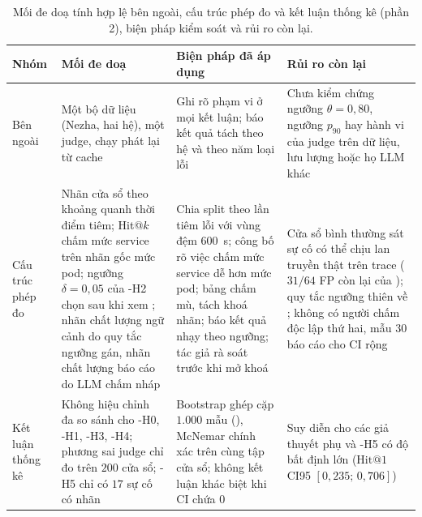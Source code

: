 \begin{table}[H]
  \centering
  \caption[Mối đe doạ tính hợp lệ bên ngoài, phép đo và thống kê]{Mối đe doạ tính hợp lệ bên ngoài, cấu trúc phép đo và kết luận thống kê (phần 2), biện pháp kiểm soát và rủi ro còn lại.}
  \label{tab:ch7-hop-le-khac}
  \tblfont
  \tblsetup
  \setlength{\tabcolsep}{3.5pt}
  \begin{tabularx}{\linewidth}{|>{\raggedright\arraybackslash}p{1.8cm}|>{\raggedright\arraybackslash}p{3.6cm}|Y|>{\raggedright\arraybackslash}p{3.8cm}|}
    \hline
    \textbf{Nhóm} & \textbf{Mối đe doạ} & \textbf{Biện pháp đã áp dụng} & \textbf{Rủi ro còn lại} \\
    \hline
    Bên ngoài & Một bộ dữ liệu (Nezha, hai hệ), một judge, chạy phát lại từ cache & Ghi rõ phạm vi ở mọi kết luận; báo kết quả tách theo hệ và theo năm loại lỗi & Chưa kiểm chứng ngưỡng $\theta = 0{,}80$, ngưỡng $p_{90}$ hay hành vi của judge trên dữ liệu, lưu lượng hoặc họ LLM khác \\
    \hline
    Cấu trúc phép đo & Nhãn cửa sổ theo khoảng quanh thời điểm tiêm; Hit@$k$ chấm mức service trên nhãn gốc mức pod; ngưỡng $\delta = 0{,}05$ của \hyp{H2} chọn sau khi xem ; nhãn chất lượng ngữ cảnh do quy tắc ngưỡng gán, nhãn chất lượng báo cáo do LLM chấm nháp & Chia split theo lần tiêm lỗi với vùng đệm $600$~s; công bố rõ việc chấm mức service dễ hơn mức pod; bảng chấm mù, tách khoá nhãn; báo kết quả nhạy theo ngưỡng; tác giả rà soát trước khi mở khoá & Cửa sổ bình thường sát sự cố có thể chịu lan truyền thật trên trace ($31/64$ FP còn lại của \CTAV{}); quy tắc ngưỡng thiên về ; không có người chấm độc lập thứ hai, mẫu $30$ báo cáo cho CI rộng \\
    \hline
    Kết luận thống kê & Không hiệu chỉnh đa so sánh cho \hyp{H0}, \hyp{H1}, \hyp{H3}, \hyp{H4}; phương sai judge chỉ đo trên $200$ cửa sổ; \hyp{H5} chỉ có $17$ sự cố có nhãn & Bootstrap ghép cặp $1.000$ mẫu (), McNemar chính xác trên cùng tập cửa sổ; không kết luận khác biệt khi CI chứa $0$ & Suy diễn cho các giả thuyết phụ và \hyp{H5} có độ bất định lớn ($\text{Hit@1}$ CI95 $[0{,}235;\, 0{,}706]$) \\
    \hline
  \end{tabularx}
\end{table}

